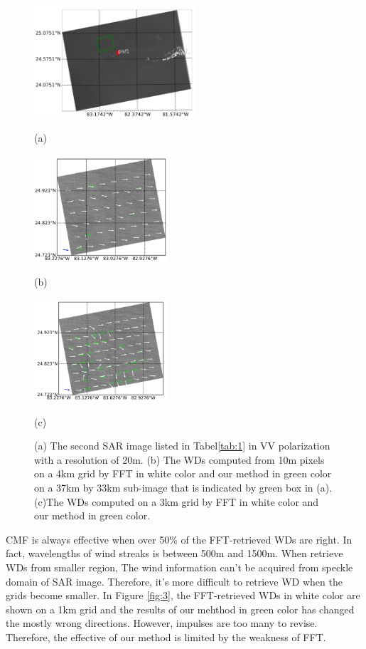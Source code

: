 \documentclass{article}
\begin{document}
\begin{figure}[tp]
\setlength{\belowcaptionskip}{-0.3cm}
\centering
\begin{minipage}[b]{0.32\linewidth}
  \centering
  \centerline{\includegraphics[width=6cm]{2.png}}
  \centerline{(a)}\medskip
\end{minipage}
\begin{minipage}[b]{0.32\linewidth}
  \centering
  \centerline{\includegraphics[width=5cm]{2_wind_a_4.png}}
  \centerline{(b)}\medskip
\end{minipage}
\begin{minipage}[b]{0.32\linewidth}
  \centering
  \centerline{\includegraphics[width=5cm]{2_wind_a_3.png}}
  \centerline{(c)}\medskip
\end{minipage}
\setlength{\abovecaptionskip}{9pt}
\caption{(a) The second SAR image listed in Tabel\ref{tab:1} in VV polarization with a resolution of 20m. (b) The WDs computed from 10m pixels on a 4km grid by FFT in white color and our method in green color on a 37km by 33km sub-image that is indicated by green box in (a). (c)The WDs computed on a 3km grid by FFT in white color and our method in green color.}
\setlength{\belowcaptionskip}{9pt}
\label{fig:2}
\end{figure}
CMF is always effective when over 50\% of the FFT-retrieved WDs are right. In fact, wavelengths of wind streaks is between 500m and 1500m\cite{Koch:2004fq}. When retrieve WDs from smaller region, The wind information can't be acquired from speckle domain of SAR image. Therefore, it's more difficult to retrieve WD when the grids become smaller. In Figure \ref{fig:3}, the FFT-retrieved WDs in white color are shown on a 1km grid and the results of our mehthod in green color has changed the mostly wrong directions. However, impulses are too many to revise. Therefore, the effective of our method is limited by the weakness of FFT.
\end{document}
